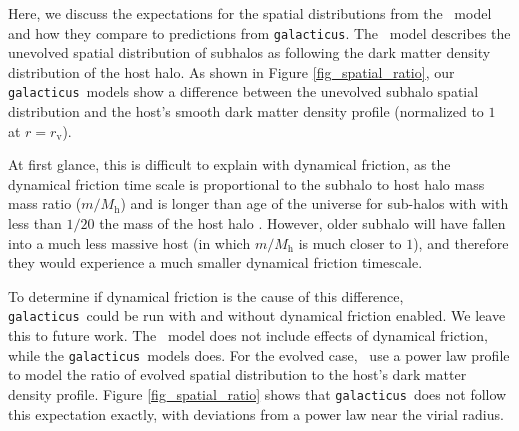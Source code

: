 \documentclass[%
 reprint,
 amsmath,
 amssymb,
 aps,
prd,
twocolumn,
superscriptaddress,
preprintnumbers,
floatfix,
nofootinbib
]{revtex4-2}
\def\gal{{\tt galacticus}~}
\def\galns{{\tt galacticus}}
\def\hanetal{\citet{10.1093/mnras/stv2900}~}
\newcommand{\reffig}[1]{Figure \ref{#1}}
\begin{document}
Here, we discuss the expectations for the spatial distributions from the \hanetal model and how they compare to predictions from \galns. 
The \hanetal model describes the unevolved spatial distribution of subhalos as following the dark matter density distribution of the host halo.
As shown in \reffig{fig_spatial_ratio}, our \gal models show a difference between the unevolved subhalo spatial distribution and the host's smooth dark matter density profile (normalized to $1$ at $r = r_{\mathrm{v}}$).

At first glance, this is difficult to explain with dynamical friction, as the dynamical friction time scale is proportional to the subhalo to host halo mass mass ratio ($m / M_\mathrm{h}$) and is longer than age of the universe for sub-halos with with less than $1 / 20$ the mass of the host halo \citep{boylan2008dynamical}.
However, older subhalo will have fallen into a much less massive host (in which $m / M_\mathrm{h}$ is much closer to $1$), and therefore they would experience a much smaller dynamical friction timescale.

To determine if dynamical friction is the cause of this difference, \gal could be run with and without dynamical friction enabled. 
We leave this to future work.
The \hanetal model does not include effects of dynamical friction, while the \gal models does.
For the evolved case, \hanetal use a power law profile to model the ratio of evolved spatial distribution to the host's dark matter density profile. 
\reffig{fig_spatial_ratio} shows that \gal does not follow this expectation exactly, with deviations from a power law near the virial radius.
\end{document}
